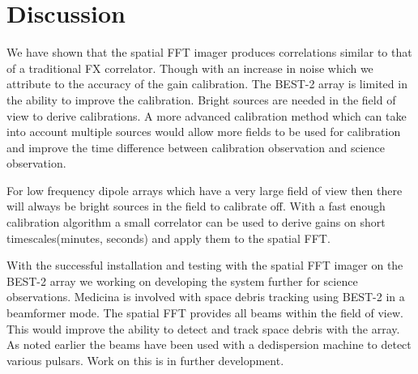 \documentclass[useAMS,macros,usenatbib,onecolumn]{mn2e}
\begin{document}
\section{Discussion}
\label{discussion}

We have shown that the spatial FFT imager produces correlations similar to that of a traditional FX correlator.
Though with an increase in noise which we attribute to the accuracy of the gain calibration.
The BEST-2 array is limited in the ability to improve the calibration.
Bright sources are needed in the field of view to derive calibrations.
A more advanced calibration method which can take into account multiple sources would allow more fields to be used for calibration and improve the time difference between calibration observation and science observation.

For low frequency dipole arrays which have a very large field of view then there will always be bright sources in the field to calibrate off.
With a fast enough calibration algorithm a small correlator can be used to derive gains on short timescales(minutes, seconds) and apply them to the spatial FFT.

With the successful installation and testing with the spatial FFT imager on the BEST-2 array we working on developing the system further for science observations.
Medicina is involved with space debris tracking using BEST-2 in a beamformer mode.
The spatial FFT provides all beams within the field of view.
This would improve the ability to detect and track space debris with the array.
As noted earlier the beams have been used with a dedispersion machine to detect various pulsars.
Work on this is in further development.
\end{document}
